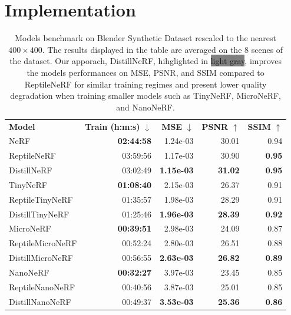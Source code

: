 \documentclass[runningheads]{llncs}
\begin{document}
\section{Implementation}

\setlength{\tabcolsep}{9pt}
\begin{table}[h!]
  \begin{center}
    \caption{Models benchmark on Blender Synthetic Dataset rescaled to the nearest $400\times400$. The results displayed in the table are averaged on the 8 scenes of the dataset. Our apporach, DistillNeRF, hihglighted in \colorbox{Gray}{light gray}, improves the models performances on MSE, PSNR, and SSIM compared to ReptileNeRF for similar training regimes and present lower quality degradation when training smaller models such as TinyNeRF, MicroNeRF, and NanoNeRF. }
    \label{tab:results}
    \begin{tabular}{lrrrr}
      \toprule \noalign{\smallskip}
        \textbf{Model} &
        \textbf{Train (h:m:s)} $\downarrow$ &
        \textbf{MSE} $\downarrow$ &
        \textbf{PSNR} $\uparrow$ &
        \textbf{SSIM} $\uparrow$ \\
      \noalign{\smallskip} \midrule
        NeRF             & \textbf{02:44:58} &         1.24e-03  &         30.01  &         0.94   \\
        ReptileNeRF      &         03:59:56  &         1.17e-03  &         30.90  & \textbf{0.95}  \\
        \rowcolor{Gray}
        DistillNeRF      &         03:02:49  & \textbf{1.15e-03} & \textbf{31.02} & \textbf{0.95}  \\
      \midrule
        TinyNeRF         & \textbf{01:08:40} &         2.15e-03  &         26.37  &         0.91   \\
        ReptileTinyNeRF  &         01:35:57  &         1.98e-03  &         28.29  &         0.91   \\
        \rowcolor{Gray}
        DistillTinyNeRF  &         01:25:46  & \textbf{1.96e-03} & \textbf{28.39} & \textbf{0.92}  \\
      \midrule
        MicroNeRF        & \textbf{00:39:51} &         2.98e-03  &         24.09  &         0.87   \\
        ReptileMicroNeRF &         00:52:24  &         2.80e-03  &         26.51  &         0.88   \\
        \rowcolor{Gray}
        DistillMicroNeRF &         00:56:55  & \textbf{2.63e-03} & \textbf{26.82} & \textbf{0.89}  \\
      \midrule
        NanoNeRF         & \textbf{00:32:27} &         3.97e-03  &         23.45  &         0.85  \\
        ReptileNanoNeRF  &         00:40:56  &         3.87e-03  &         25.01  &         0.85  \\
        \rowcolor{Gray}
        DistillNanoNeRF  &         00:49:37  & \textbf{3.53e-03} & \textbf{25.36} & \textbf{0.86} \\
      \bottomrule
    \end{tabular}
  \end{center}
\end{table}
\end{document}
